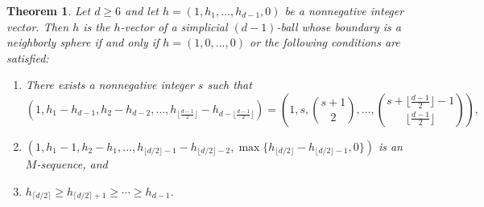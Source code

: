 \documentclass[11pt]{article}
\newtheorem{theorem}{Theorem}[section]
\theoremstyle{definition}
\numberwithin{equation}{theorem}
\begin{document}
\begin{theorem} \label{thm:neighborly}
Let $d\geq 6$ and let $h=(1,h_1, \ldots, h_{d-1}, 0)$ be a nonnegative integer vector. Then $h$ is the $h$-vector of a simplicial $(d-1)$-ball whose boundary is a neighborly sphere if and only if $h = (1,0,\ldots, 0)$ or the following conditions are satisfied:
\begin{enumerate}
\item There exists a nonnegative integer $s$ such that
\begin{equation*}
(1, h_1-h_{d-1}, h_2-h_{d-2}, \ldots, h_{\lfloor\frac{d-1}{2}\rfloor}-h_{d-\lfloor\frac{d-1}{2}\rfloor}) = \left(1, s, \binom{s+1}{2}, \ldots, \binom{s+\lfloor\frac{d-1}{2}\rfloor-1}{\lfloor\frac{d-1}{2}\rfloor}\right), 
\end{equation*}
\item $(1, h_1-1, h_2-h_1, \ldots, h_{\lfloor d/2 \rfloor-1} - h_{\lfloor d/2 \rfloor-2}, \max\{h_{\lfloor d/2 \rfloor} - h_{\lfloor d/2 \rfloor-1},0\})$ is an $M$-sequence, and
\item $h_{\lceil d/2 \rceil} \geq h_{\lceil d/2 \rceil +1} \geq \cdots \geq h_{d-1}$.
\end{enumerate}
\end{theorem}
\end{document}
